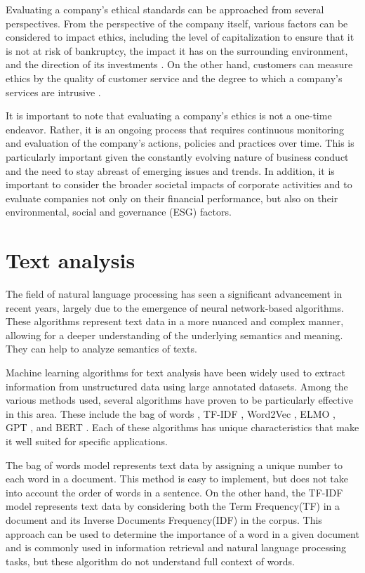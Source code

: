 \documentclass[PI]{ProjectProposal}
\begin{document}
Evaluating a company's ethical standards can be approached from several perspectives. From the perspective of the company itself, various factors can be considered to impact ethics, including the level of capitalization to ensure that it is not at risk of bankruptcy, the impact it has on the surrounding environment, and the direction of its investments \autocite{harvey1995ethical}. On the other hand, customers can measure ethics by the quality of customer service \autocite{brunk2010exploring} and the degree to which a company's services are intrusive \autocite{mitchell1992bank}.

It is important to note that evaluating a company's ethics is not a one-time endeavor. Rather, it is an ongoing process that requires continuous monitoring and evaluation of the company's actions, policies and practices over time. This is particularly important given the constantly evolving nature of business conduct and the need to stay abreast of emerging issues and trends. In addition, it is important to consider the broader societal impacts of corporate activities and to evaluate companies not only on their financial performance, but also on their environmental, social and governance (ESG) factors.
\section{Text analysis}
\label{sec:org8b35bd5}
The field of natural language processing has seen a significant advancement in recent years\autocites{devlin2018bert}[][]{wang2018glue}, largely due to the emergence of neural network-based algorithms. These algorithms represent text data in a more nuanced and complex manner, allowing for a deeper understanding of the underlying semantics and meaning. They can help to analyze semantics of texts.

Machine learning algorithms for text analysis have been widely used to extract information from unstructured data using large annotated datasets. Among the various methods used, several algorithms have proven to be particularly effective in this area. These include the bag of words \autocite{doi:10.1080/00437956.1954.11659520}, TF-IDF \autocite{jones1972statistical}, Word2Vec\autocite{mikolov2013distributed} , ELMO \autocite{elmo}, GPT \autocite{radford2019language}, and BERT \autocite{devlin2018bert}. Each of these algorithms has unique characteristics that make it well suited for specific applications.

The bag of words model represents text data by assigning a unique number to each word in a document. This method is easy to implement, but does not take into account the order of words in a sentence. On the other hand, the TF-IDF model represents text data by considering both the Term Frequency(TF) in a document and its Inverse Documents Frequency(IDF) in the corpus. This approach can be used to determine the importance of a word in a given document and is commonly used in information retrieval and natural language processing tasks, but these algorithm do not understand full context of words.
\end{document}
